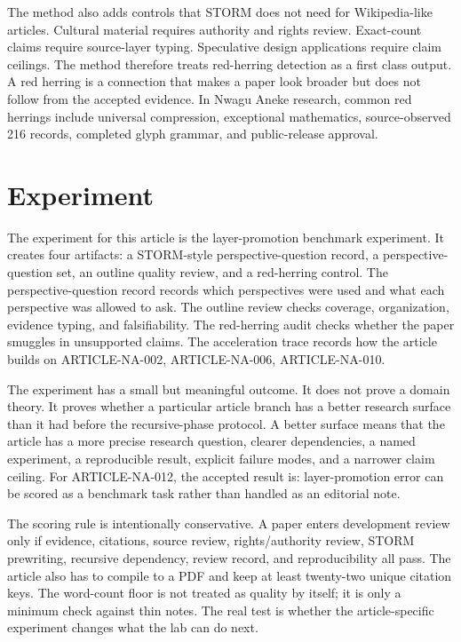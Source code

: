 \documentclass[sigconf,nonacm]{acmart}
\begin{document}
The method also adds controls that STORM does not need for Wikipedia-like
articles. Cultural material requires authority and rights review. Exact-count
claims require source-layer typing. Speculative design applications require
claim ceilings. The method therefore treats red-herring detection as a first
class output. A red herring is a connection that makes a paper look broader but
does not follow from the accepted evidence. In Nwagu Aneke research, common red
herrings include universal compression, exceptional mathematics, source-observed
216 records, completed glyph grammar, and public-release approval.

\section{Experiment}
The experiment for this article is the layer-promotion benchmark experiment. It creates four artifacts: a
STORM-style perspective-question record, a perspective-question set, an outline quality
review, and a red-herring control. The perspective-question record records which perspectives
were used and what each perspective was allowed to ask. The outline review checks
coverage, organization, evidence typing, and falsifiability. The red-herring
audit checks whether the paper smuggles in unsupported claims. The acceleration
trace records how the article builds on ARTICLE-NA-002, ARTICLE-NA-006, ARTICLE-NA-010.

The experiment has a small but meaningful outcome. It does not prove a domain
theory. It proves whether a particular article branch has a better research
surface than it had before the recursive-phase protocol. A better surface means
that the article has a more precise research question, clearer dependencies, a named
experiment, a reproducible result, explicit failure modes, and a narrower claim
ceiling. For ARTICLE-NA-012, the accepted result is: layer-promotion error can be scored as a benchmark task rather than handled as an editorial note.

The scoring rule is intentionally conservative. A paper enters development
review only if evidence, citations, source review, rights/authority review,
STORM prewriting, recursive dependency, review record, and reproducibility
all pass. The article also has to compile to a PDF and keep at least twenty-two
unique citation keys. The word-count floor is not treated as quality by itself;
it is only a minimum check against thin notes. The real test is whether the
article-specific experiment changes what the lab can do next.
\end{document}
